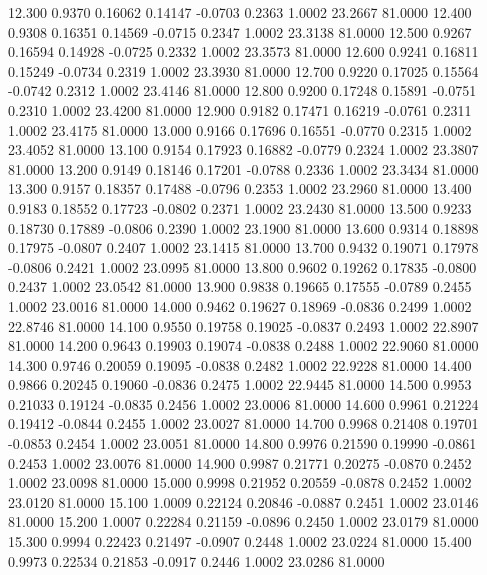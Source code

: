   12.300   0.9370   0.16062   0.14147  -0.0703   0.2363   1.0002  23.2667  81.0000
  12.400   0.9308   0.16351   0.14569  -0.0715   0.2347   1.0002  23.3138  81.0000
  12.500   0.9267   0.16594   0.14928  -0.0725   0.2332   1.0002  23.3573  81.0000
  12.600   0.9241   0.16811   0.15249  -0.0734   0.2319   1.0002  23.3930  81.0000
  12.700   0.9220   0.17025   0.15564  -0.0742   0.2312   1.0002  23.4146  81.0000
  12.800   0.9200   0.17248   0.15891  -0.0751   0.2310   1.0002  23.4200  81.0000
  12.900   0.9182   0.17471   0.16219  -0.0761   0.2311   1.0002  23.4175  81.0000
  13.000   0.9166   0.17696   0.16551  -0.0770   0.2315   1.0002  23.4052  81.0000
  13.100   0.9154   0.17923   0.16882  -0.0779   0.2324   1.0002  23.3807  81.0000
  13.200   0.9149   0.18146   0.17201  -0.0788   0.2336   1.0002  23.3434  81.0000
  13.300   0.9157   0.18357   0.17488  -0.0796   0.2353   1.0002  23.2960  81.0000
  13.400   0.9183   0.18552   0.17723  -0.0802   0.2371   1.0002  23.2430  81.0000
  13.500   0.9233   0.18730   0.17889  -0.0806   0.2390   1.0002  23.1900  81.0000
  13.600   0.9314   0.18898   0.17975  -0.0807   0.2407   1.0002  23.1415  81.0000
  13.700   0.9432   0.19071   0.17978  -0.0806   0.2421   1.0002  23.0995  81.0000
  13.800   0.9602   0.19262   0.17835  -0.0800   0.2437   1.0002  23.0542  81.0000
  13.900   0.9838   0.19665   0.17555  -0.0789   0.2455   1.0002  23.0016  81.0000
  14.000   0.9462   0.19627   0.18969  -0.0836   0.2499   1.0002  22.8746  81.0000
  14.100   0.9550   0.19758   0.19025  -0.0837   0.2493   1.0002  22.8907  81.0000
  14.200   0.9643   0.19903   0.19074  -0.0838   0.2488   1.0002  22.9060  81.0000
  14.300   0.9746   0.20059   0.19095  -0.0838   0.2482   1.0002  22.9228  81.0000
  14.400   0.9866   0.20245   0.19060  -0.0836   0.2475   1.0002  22.9445  81.0000
  14.500   0.9953   0.21033   0.19124  -0.0835   0.2456   1.0002  23.0006  81.0000
  14.600   0.9961   0.21224   0.19412  -0.0844   0.2455   1.0002  23.0027  81.0000
  14.700   0.9968   0.21408   0.19701  -0.0853   0.2454   1.0002  23.0051  81.0000
  14.800   0.9976   0.21590   0.19990  -0.0861   0.2453   1.0002  23.0076  81.0000
  14.900   0.9987   0.21771   0.20275  -0.0870   0.2452   1.0002  23.0098  81.0000
  15.000   0.9998   0.21952   0.20559  -0.0878   0.2452   1.0002  23.0120  81.0000
  15.100   1.0009   0.22124   0.20846  -0.0887   0.2451   1.0002  23.0146  81.0000
  15.200   1.0007   0.22284   0.21159  -0.0896   0.2450   1.0002  23.0179  81.0000
  15.300   0.9994   0.22423   0.21497  -0.0907   0.2448   1.0002  23.0224  81.0000
  15.400   0.9973   0.22534   0.21853  -0.0917   0.2446   1.0002  23.0286  81.0000

